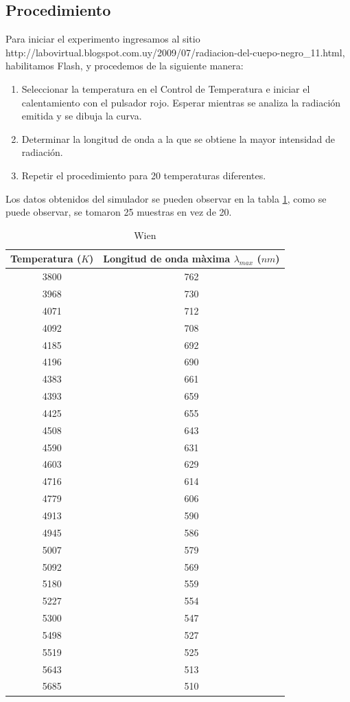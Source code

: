\documentclass[a4paper]{article}
\begin{document}
\subsection{Procedimiento}

Para iniciar el experimento ingresamos al sitio http://labovirtual.blogspot.com.uy/2009/07/radiacion-del-cuepo-negro\_11.html, habilitamos Flash, y procedemos de la siguiente manera:

\begin{enumerate}
    \item Seleccionar la temperatura en el Control de Temperatura e iniciar el calentamiento con
el pulsador rojo. Esperar mientras se analiza la radiación emitida y se dibuja la curva.
    \item Determinar la longitud de onda a la que se obtiene la mayor intensidad de radiación.
    \item Repetir el procedimiento para 20 temperaturas diferentes.
\end{enumerate}

Los datos obtenidos del simulador se pueden observar en la tabla \ref{tabla2}, como se puede observar, se tomaron 25 muestras en vez de 20.

\begin{table}[h!]
\centering
\begin{tabular}{c|c}
Temperatura ($K$) & Longitud de onda màxima $\lambda_{max}$ ($nm$)\\\hline
3800 & 762 \\
3968 & 730 \\
4071 & 712 \\
4092 & 708 \\
4185 & 692 \\
4196 & 690 \\
4383 & 661 \\
4393 & 659 \\
4425 & 655 \\
4508 & 643 \\
4590 & 631 \\
4603 & 629 \\
4716 & 614 \\
4779 & 606 \\
4913 & 590 \\
4945 & 586 \\
5007 & 579 \\
5092 & 569 \\
5180 & 559 \\
5227 & 554 \\
5300 & 547 \\
5498 & 527 \\
5519 & 525 \\
5643 & 513 \\
5685 & 510
\end{tabular}
\caption{\label{tabla2}Wien}
\end{table}
\end{document}
